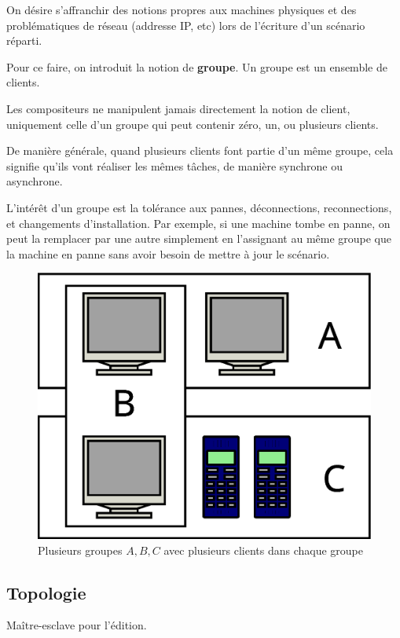 \documentclass{article}
\newcommand\vocab[1]{\textbf{#1}}
\begin{document}
On désire s'affranchir des notions propres aux machines physiques et des problématiques de réseau (addresse IP, etc) lors de l'écriture 
d'un scénario réparti. 

Pour ce faire, on introduit la notion de \vocab{groupe}. 
Un groupe est un ensemble de clients.

Les compositeurs ne manipulent jamais directement la notion de client, uniquement celle d'un groupe qui peut contenir zéro, un, ou plusieurs clients.

De manière générale, quand plusieurs clients font partie d'un même groupe, cela signifie qu'ils vont réaliser les mêmes tâches, de manière synchrone ou asynchrone.

L'intérêt d'un groupe est la tolérance aux pannes, déconnections, reconnections, et changements d'installation. 
Par exemple, si une machine tombe en panne, on peut la remplacer par une autre simplement en l'assignant au même groupe que la machine en panne 
sans avoir besoin de mettre à jour le scénario.


\begin{figure}[h]
	\centering
	\includegraphics[scale=0.2]{images/groupes.eps}
	\caption{Plusieurs groupes $A,B,C$ avec plusieurs clients dans chaque groupe}
	\label{img.groupes}
\end{figure}


\subsection{Topologie}
Maître-esclave pour l'édition.
\end{document}
